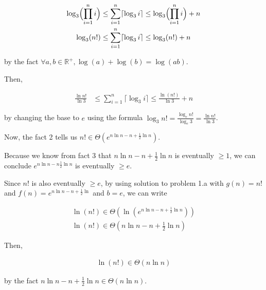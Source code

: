 \documentclass[12pt]{article}
\begin{document}
\begin{enumerate}[a.]
\begin{mdframed}
        \begin{align}
            \log_3 \Bigl(\prod\limits_{i=1}^n i \Bigr) &\leq \sum\limits_{i=1}^n \lceil \log_3 i \rceil \leq \log_3 \Bigl(\prod\limits_{i=1}^n i \Bigr) + n\\
            \log_3 (n!) &\leq \sum\limits_{i=1}^n \lceil \log_3 i \rceil \leq \log_3 (n!) + n
        \end{align}

        by the fact $\forall a,b \in \mathbb{R}^{+}, \log (a) + \log (b) = \log (ab)$.

        \bigskip

        Then,

        \begin{align}
            \frac{\ln n!}{\ln 3} &\leq \sum\limits_{i=1}^n \lceil \log_3 i \rceil \leq \frac{\ln (n!)}{\ln 3} + n
        \end{align}

        by changing the base to $e$ using the formula $\log_3 n! = \frac{\log_e n!}{\log_e 3} = \frac{\ln n!}{\ln 3}$.

        \bigskip

        Now, the fact 2 tells us $n! \in \Theta (e^{n\ln n - n + \frac{1}{2}\ln n})$.

        \bigskip

        Because we know from fact 3 that $n\ln n - n + \frac{1}{2}\ln n$ is
        eventually $\geq 1$, we can conclude $e^{n\ln n - n \frac{1}{2} \ln n}$ is
        eventually $\geq e$.

        \bigskip

        Since $n!$ is also eventually $\geq e$, by using solution to problem 1.a with
        $g(n) = n!$ and $f(n) = e^{n\ln n - n + \frac{1}{2}\ln }$ and $b = e$,
        we can write

        \begin{align}
            \ln(n!) \in \Theta(\ln(e^{n\ln n - n + \frac{1}{2}\ln n}))\\
            \ln(n!) \in \Theta(n\ln n - n + \frac{1}{2}\ln n)
        \end{align}

        \bigskip

        Then,

        \begin{align}
            \ln(n!) \in \Theta(n\ln n)
        \end{align}

        by the fact $n \ln n - n + \frac{1}{2} \ln n \in \Theta(n \ln n)$.


\end{mdframed}
\end{enumerate}
\end{document}
